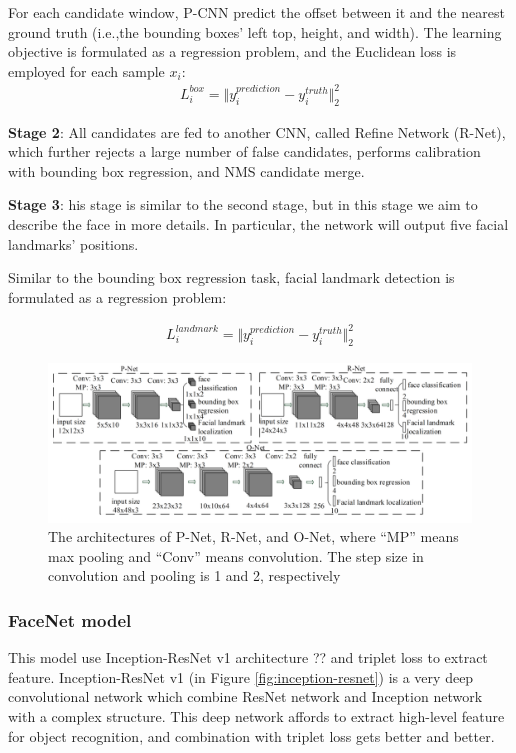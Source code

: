\documentclass[journal, twocolumn]{IEEEtran}
\begin{document}
For each candidate window, P-CNN predict the offset between it and the nearest ground truth (i.e.,the bounding boxes’ left top, height, and width). The learning objective is formulated as a regression problem, and  the Euclidean loss is employed for each sample $x_i$:
\begin{align}
	L_i^{box} = \Vert y_i^{prediction} - y_i^{truth} \Vert _2^2
\end{align}
		
\textbf{Stage 2}: All candidates are fed to another CNN, called Refine Network (R-Net), which further rejects a large number of false candidates, performs calibration with bounding box regression, and NMS candidate merge.

\textbf{Stage 3}: his stage is similar to the second stage, but in this stage we aim to describe the face in more details. In particular, the network will output five facial landmarks’ positions.

Similar to the bounding box regression task, facial landmark detection is formulated as a regression problem: 

\begin{align}
	L_i^{landmark} = \Vert y_i^{prediction} - y_i^{truth} \Vert _2^2
\end{align}

\begin{figure}
    \centering
    \includegraphics[width=1\linewidth]{img/mtcnn_arch.png}
	\caption{The architectures of P-Net, R-Net, and O-Net, where “MP” means max pooling and “Conv” means convolution. The step size in convolution and pooling
is 1 and 2, respectively}\label{fig:mtcnn-arch}
\end{figure}


\subsubsection{FaceNet model} 
This model use Inception-ResNet v1 architecture ?? and triplet loss to extract feature. Inception-ResNet v1 (in Figure \ref{fig:inception-resnet}) is a very deep convolutional network which combine ResNet network and Inception network with a complex structure. This deep network affords to extract high-level feature for object recognition, and combination with triplet loss gets better and better. 
\end{document}
